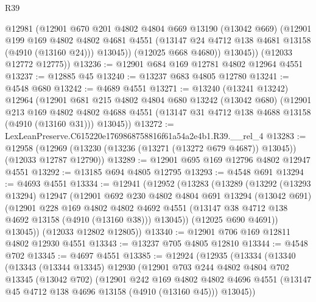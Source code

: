 \begin{lexlean}{R39}
\begin{coremodule}
            @12981
            (@12901
              @670
              @201
              @4802
              @4804
              @669
              @13190
              (@13042 @669)
              (@12901
                @199
                @169
                @4802
                @4802
                @4681
                @4551
                (@13147 @24 @4712 @138 @4681 @13158 (@4910 (@13160 @24)))
                @13045))
            (@12025 @668 @4680))
          @13045))
      (@12033 @12772 @12775))
@13236 := @12901 @684 @169 @12781 @4802 @12964 @4551
@13237 := @12885 @45
@13240 := @13237 @683 @4805 @12780
@13241 := @4548 @680
@13242 := @4689 @4551
@13271 := @13240
    (@13241 @13242)
    @12964
    (@12901
      @681
      @215
      @4802
      @4804
      @680
      @13242
      (@13042 @680)
      (@12901
        @213
        @169
        @4802
        @4802
        @4688
        @4551
        (@13147 @31 @4712 @138 @4688 @13158 (@4910 (@13160 @31)))
        @13045))
@13272 := LexLeanPreserve.C615220e1769868758816f61a54a2e4b1.R39.__rel_4
@13283 := @12958
    (@12969 (@13230 (@13236 (@13271 (@13272 @679 @4687)) @13045)) (@12033 @12787 @12790))
@13289 := @12901 @695 @169 @12796 @4802 @12947 @4551
@13292 := @13185 @694 @4805 @12795
@13293 := @4548 @691
@13294 := @4693 @4551
@13334 := @12941
    (@12952
      (@13283
        (@13289
          (@13292
            (@13293 @13294)
            @12947
            (@12901
              @692
              @230
              @4802
              @4804
              @691
              @13294
              (@13042 @691)
              (@12901
                @228
                @169
                @4802
                @4802
                @4692
                @4551
                (@13147 @38 @4712 @138 @4692 @13158 (@4910 (@13160 @38)))
                @13045))
            (@12025 @690 @4691))
          @13045))
      (@12033 @12802 @12805))
@13340 := @12901 @706 @169 @12811 @4802 @12930 @4551
@13343 := @13237 @705 @4805 @12810
@13344 := @4548 @702
@13345 := @4697 @4551
@13385 := @12924
    (@12935
      (@13334
        (@13340
          (@13343
            (@13344 @13345)
            @12930
            (@12901
              @703
              @244
              @4802
              @4804
              @702
              @13345
              (@13042 @702)
              (@12901
                @242
                @169
                @4802
                @4802
                @4696
                @4551
                (@13147 @45 @4712 @138 @4696 @13158 (@4910 (@13160 @45)))
                @13045))

\end{coremodule}
\end{lexlean}
